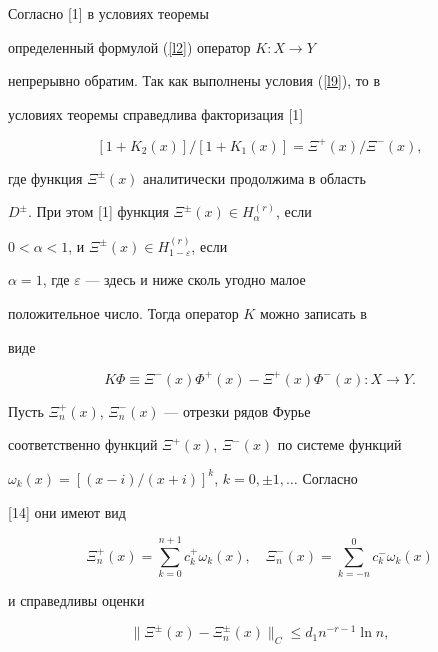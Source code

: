 \begin{pf}


Согласно [1]  в условиях теоремы


определенный формулой (\ref{l2}) оператор $K:X\rightarrow Y$


непрерывно обратим. Так как выполнены условия (\ref{l9}), то в


условиях теоремы справедлива факторизация [1]


$$


[1+K_2(x)]/[1+K_1(x)]=\Xi^+(x)/\Xi^-(x),


$$


где функция $\Xi^\pm(x)$ аналитически продолжима в область


$D^\pm$. При этом [1] функция $\Xi^\pm(x) \in H_\alpha^{(r)}$, если


$0<\alpha<1$, и $\Xi^\pm(x) \in H_{1-\varepsilon}^{(r)}$, если


$\alpha = 1$, где $\varepsilon$ --- здесь и ниже сколь угодно малое


положительное число. Тогда оператор $K$ можно записать в


виде


\begin{equation}


\label{l12} K\Phi\equiv\Xi^-(x)\Phi^+(x)-\Xi^+(x)\Phi^-(x):


X\rightarrow Y.


\end{equation}


Пусть $\Xi^+_n(x)$, $\Xi^-_n(x)$ --- отрезки рядов Фурье


соответственно функций $\Xi^+(x)$, $\Xi^-(x)$ по системе функций


$\omega_k(x)=[(x-i)/(x+i)]^k$, $k=0,\pm 1,\dotsc$ Согласно 


[14] они имеют вид


\begin{equation}


\label{l13} \Xi^+_n(x)=\sum\limits_{k=0}^{n+1} c_k^+\omega_k(x),


\quad \Xi^-_n(x)=\sum\limits_{k=-n}^0 c_k^-\omega_k(x)


\end{equation}


и справедливы оценки


\begin{equation}


\label{l14} \|\Xi^\pm(x)-\Xi^\pm_n(x)\|_C \leqslant d_1n^{-r-1}\ln n,



\end{equation}
\end{pf}
